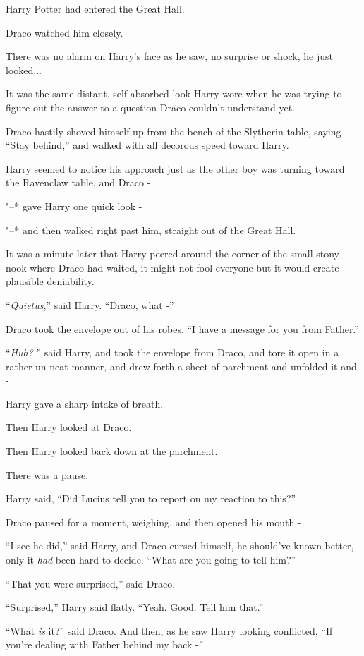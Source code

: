 Harry Potter had entered the Great Hall.

Draco watched him closely.

There was no alarm on Harry's face as he saw, no surprise or shock, he
just looked...

It was the same distant, self-absorbed look Harry wore when he was
trying to figure out the answer to a question Draco couldn't understand
yet.

Draco hastily shoved himself up from the bench of the Slytherin table,
saying ``Stay behind,'' and walked with all decorous speed toward Harry.

Harry seemed to notice his approach just as the other boy was turning
toward the Ravenclaw table, and Draco -

"--* gave Harry one quick look -

"--* and then walked right past him, straight out of the Great Hall.

It was a minute later that Harry peered around the corner of the small
stony nook where Draco had waited, it might not fool everyone but it
would create plausible deniability.

``\emph{Quietus},'' said Harry. ``Draco, what -''

Draco took the envelope out of his robes. ``I have a message for you
from Father.''

``\emph{Huh?} '' said Harry, and took the envelope from Draco, and tore it
open in a rather un-neat manner, and drew forth a sheet of parchment and
unfolded it and -

Harry gave a sharp intake of breath.

Then Harry looked at Draco.

Then Harry looked back down at the parchment.

There was a pause.

Harry said, ``Did Lucius tell you to report on my reaction to this?''

Draco paused for a moment, weighing, and then opened his mouth -

``I see he did,'' said Harry, and Draco cursed himself, he should've
known better, only it \emph{had} been hard to decide. ``What are you
going to tell him?''

``That you were surprised,'' said Draco.

``Surprised,'' Harry said flatly. ``Yeah. Good. Tell him that.''

``What \emph{is} it?'' said Draco. And then, as he saw Harry looking
conflicted, ``If you're dealing with Father behind my back -''

